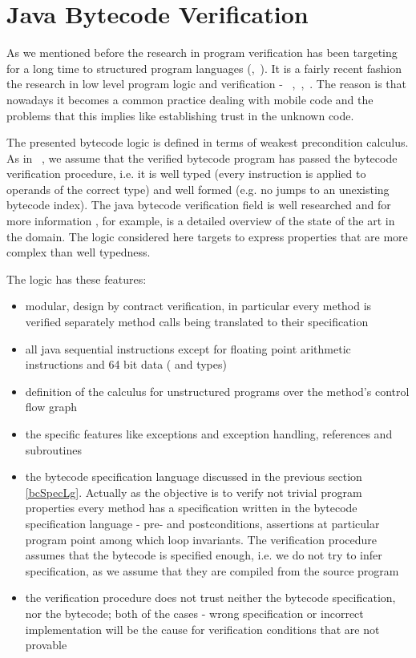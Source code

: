 
\section{Java Bytecode Verification}\label{verifCond}
As we mentioned before the research in program verification has been targeting for a long time to structured program languages (\cite{WPCDS},~\cite{DisDij}). 
It is a fairly recent fashion the research in low level program logic and verification -  ~\cite{B04tlsj},~\cite{BM05plb},~\cite{Quigley}.
The reason is that nowadays it becomes a common practice dealing with mobile code and the problems that this implies like establishing trust in the unknown code. 

The presented bytecode logic is defined in terms of weakest precondition calculus. As in ~\cite{BM05plb}, we assume 
that the verified bytecode program has passed the bytecode verification procedure, i.e. it is well typed 
(every instruction is applied to operands of the correct type) and well formed 
(e.g. no jumps to an unexisting bytecode index). The java bytecode verification field is  well researched and 
for more information \cite{Ljbc}, for example, is a detailed overview of the state of the art in the domain. 
The logic considered here targets to express properties that are more complex than well typedness.

The logic has these features:
\begin{itemize}
\item modular, design by contract verification, in particular every method is verified separately method calls being translated to their specification 
\item all java sequential instructions except for floating point arithmetic instructions and 64 bit data ( and  types)
\item definition of the calculus for unstructured programs over the method's control flow graph
\item the specific features like exceptions and exception handling, references and subroutines
\item the bytecode specification language discussed in the previous section \ref{bcSpecLg}. 
Actually as the objective is to verify not trivial program properties every method has a specification written 
in the bytecode specification language - pre- and postconditions, assertions at particular program point among 
which loop invariants. The verification procedure assumes that the bytecode is specified enough, i.e. 
we do not try to infer specification, as we assume that they are compiled from the source program
\item the verification procedure does not trust neither the bytecode specification, nor the bytecode; both of the cases - wrong 
specification or incorrect implementation will be the cause for verification conditions that are not provable 
\end{itemize}

